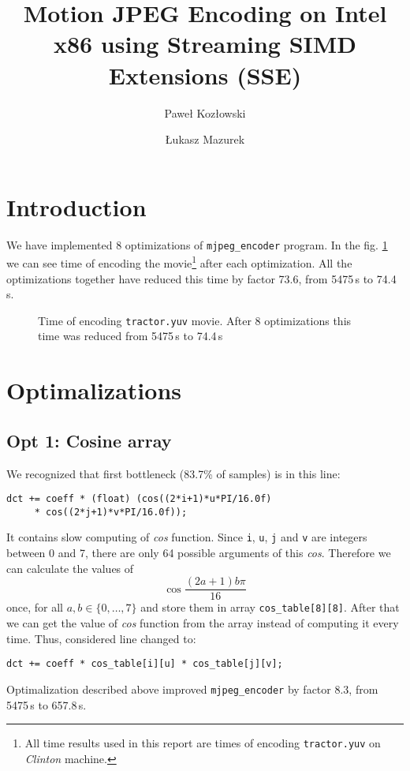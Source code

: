 \documentclass[11pt]{article}
\title{Motion JPEG Encoding on Intel x86 using Streaming SIMD Extensions (SSE)}
\author{Paweł Kozłowski \and Łukasz Mazurek}
\begin{document}
\maketitle

\section{Introduction}
We have implemented 8 optimizations of \texttt{mjpeg\_encoder} program.
In the fig. \ref{times_plot} we can see time of encoding the movie\footnote{All time results used in this report are times of encoding \texttt{tractor.yuv} on \emph{Clinton} machine.} after each optimization.
All the optimizations together have reduced this time by factor 73.6, from 5475\,s to 74.4\,s.

\begin{figure}[h]
	\centering
	
	\caption{Time of encoding \texttt{tractor.yuv} movie. After 8 optimizations this time was reduced from 5475\,s to 74.4\,s}
	\label{times_plot}
\end{figure}


\section{Optimalizations}
\subsection{Opt 1: Cosine array}
We recognized that first bottleneck (83.7\% of samples) is in this line:

\begin{lstlisting}
dct += coeff * (float) (cos((2*i+1)*u*PI/16.0f) 
     * cos((2*j+1)*v*PI/16.0f));
\end{lstlisting}
It contains slow computing of \emph{cos} function.
Since \texttt{i}, \texttt{u}, \texttt{j} and \texttt{v} are integers between 0 and 7, there are only 64 possible arguments of this \emph{cos}.
Therefore we can calculate the values of 
$$\cos \frac{(2a + 1) b \pi}{16}$$
once, for all $a, b \in \{0, \ldots, 7 \}$ and store them in array \texttt{cos\_table[8][8]}.
After that we can get the value of \emph{cos} function from the array instead of computing it every time.
Thus, considered line changed to:
\begin{lstlisting}
dct += coeff * cos_table[i][u] * cos_table[j][v];
\end{lstlisting}

Optimalization described above improved \texttt{mjpeg\_encoder} by factor 8.3, from 5475\,s to 657.8\,s.
\end{document}
